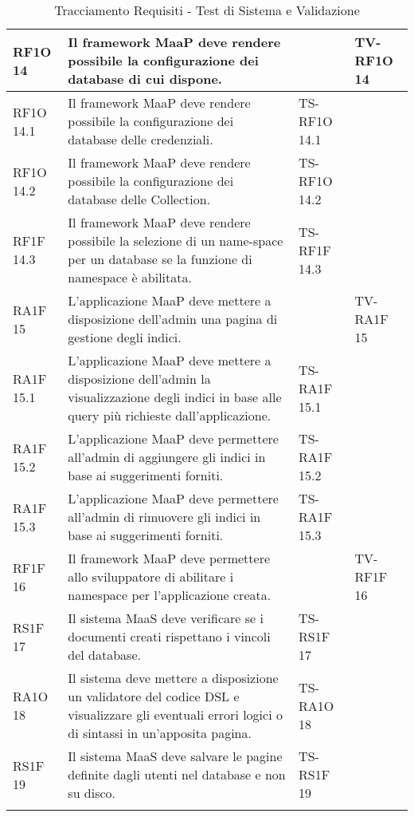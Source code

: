 \begin{center}
\begin{longtable}{| p{2cm} | p{6cm} | p{2.5cm} | p{2.5cm} | }
        RF1O 14 & 
        Il framework MaaP deve rendere possibile la configurazione dei database di cui dispone. &  & TV-RF1O 14 \\ \hline 
        RF1O 14.1 & 
        Il framework MaaP deve rendere possibile la configurazione dei database delle credenziali. & TS-RF1O 14.1 & \\ \hline 
        RF1O 14.2 & 
        Il framework MaaP deve rendere possibile la configurazione dei database delle Collection. & TS-RF1O 14.2 & \\ \hline 
        RF1F 14.3 & 
        Il framework MaaP deve rendere possibile la selezione di un name-space per un database se la funzione di namespace è abilitata. & TS-RF1F 14.3 & \\ \hline 
        RA1F 15 & 
        L’applicazione MaaP deve mettere a disposizione dell’admin una pagina di gestione degli indici. &  & TV-RA1F 15 \\ \hline 
        RA1F 15.1 & 
        L’applicazione MaaP deve mettere a disposizione dell’admin la visualizzazione degli indici in base alle query più richieste dall’applicazione. & TS-RA1F 15.1 & \\ \hline 
        RA1F 15.2 & 
        L’applicazione MaaP deve permettere all’admin di aggiungere gli indici in base ai suggerimenti forniti. & TS-RA1F 15.2 & \\ \hline 
        RA1F 15.3 & 
        L’applicazione MaaP deve permettere all’admin di rimuovere gli indici in base ai suggerimenti forniti. & TS-RA1F 15.3 & \\ \hline 
        RF1F 16 & 
        Il framework MaaP deve permettere allo sviluppatore di abilitare i namespace per l’applicazione creata. &  & TV-RF1F 16 \\ \hline 
        RS1F 17 & 
        Il sistema MaaS deve verificare se i documenti creati rispettano i vincoli del database. & TS-RS1F 17 & \\ \hline 
        RA1O 18 & 
        Il sistema deve mettere a disposizione un validatore del codice DSL e visualizzare gli eventuali errori logici o di sintassi in un'apposita pagina. & TS-RA1O 18 & \\ \hline 
        RS1F 19 & 
        Il sistema MaaS deve salvare le pagine definite dagli utenti nel database e non su disco. & TS-RS1F 19 & \\ \hline 
    \caption{Tracciamento Requisiti - Test di Sistema e Validazione}
    \end{longtable}
   \egroup
\end{center}
\clearpage
